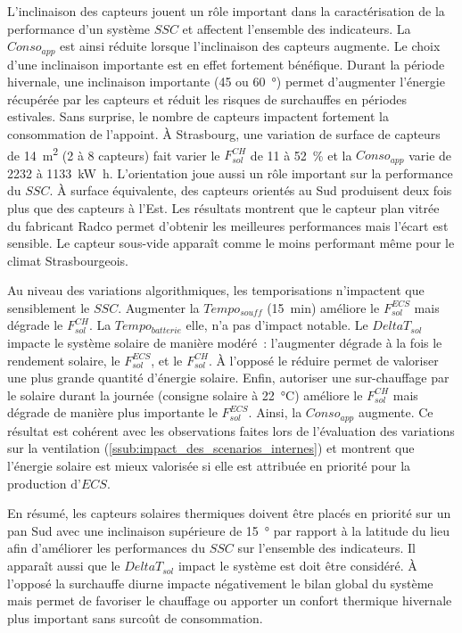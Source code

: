 L’inclinaison des capteurs jouent un rôle important dans la caractérisation de la
performance d’un système $SSC$ et affectent l’ensemble des indicateurs. La $Conso_{app}$
est ainsi réduite lorsque l’inclinaison des capteurs augmente. Le choix d’une inclinaison
importante est en effet fortement bénéfique. Durant la période hivernale, une inclinaison
importante (\num{45} ou \SI{60}{\degree}) permet d’augmenter l’énergie récupérée par les
capteurs et réduit les risques de surchauffes en périodes estivales. Sans surprise, le
nombre de capteurs impactent fortement la consommation de l’appoint. À Strasbourg, une
variation de surface de capteurs de \SI{14}{\meter\squared} (\num{2} à \num{8} capteurs)
fait varier le $F_{sol}^{CH}$ de \num{11} à \SI{52}{\percent} et la $Conso_{app}$ varie de
\num{2232} à \SI{1133}{\kilo\watt\hour}. L’orientation joue aussi un rôle important sur la
performance du $SSC$. À surface équivalente, des capteurs orientés au Sud produisent deux
fois plus que des capteurs à l’Est. Les résultats montrent que le capteur plan vitrée du
fabricant Radco permet d’obtenir les meilleures performances mais l’écart est sensible. Le
capteur sous-vide apparaît comme le moins performant même pour le climat Strasbourgeois.

Au niveau des variations algorithmiques, les temporisations n’impactent que sensiblement
le $SSC$. Augmenter la $Tempo_{souff}$ (\SI{15}{min}) améliore le $F_{sol}^{ECS}$ mais dégrade
le $F_{sol}^{CH}$. La $Tempo_{batterie}$ elle, n’a pas d’impact notable. Le $DeltaT_{sol}$
impacte le système solaire de manière modéré~: l’augmenter dégrade à la fois le rendement
solaire, le $F_{sol}^{ECS}$, et le $F_{sol}^{CH}$. À l’opposé le réduire permet de valoriser une plus
grande quantité d’énergie solaire. Enfin, autoriser une sur-chauffage par le solaire
durant la journée (consigne solaire à \SI{22}{\celsius}) améliore le $F_{sol}^{CH}$ mais dégrade
de manière plus importante le $F_{sol}^{ECS}$. Ainsi, la $Conso_{app}$ augmente. Ce résultat est
cohérent avec les observations faites lors de l’évaluation des variations sur la
ventilation (\ref{ssub:impact_des_scenarios_internes}) et montrent que l’énergie solaire
est mieux valorisée si elle est attribuée en priorité pour la production d’$ECS$.

En résumé, les capteurs solaires thermiques doivent être placés en priorité sur un pan Sud
avec une inclinaison supérieure de \SI{15}{\degree} par rapport à la latitude du lieu afin
d’améliorer les performances du $SSC$ sur l’ensemble des indicateurs. Il apparaît aussi
que le $DeltaT_{sol}$ impact le système est doit être considéré. À l’opposé la surchauffe
diurne impacte négativement le bilan global du système mais permet de favoriser le
chauffage ou apporter un confort thermique hivernale plus important sans surcoût de
consommation.





